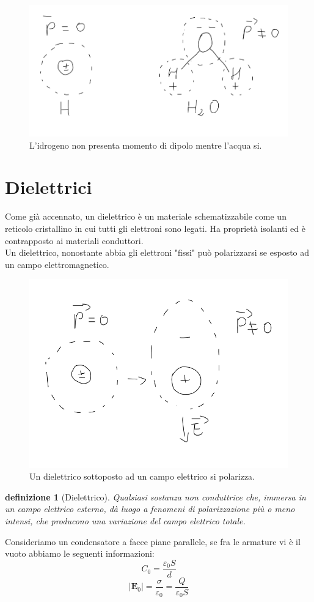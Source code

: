 \documentclass[10pt,a4paper]{article}
\newtheorem{definizione}{definizione}
\begin{document}
\begin{figure}[h!]
	\centering
	\includegraphics[width=0.5\linewidth]{images/dipolo_H_H2O}
	\caption{L'idrogeno non presenta momento di dipolo mentre l'acqua si.}
	\label{fig:dipolohh2o}
\end{figure}
\FloatBarrier
\section{Dielettrici}
Come già accennato, un dielettrico è un materiale schematizzabile come un reticolo cristallino in cui tutti gli elettroni sono legati. Ha proprietà isolanti ed è contrapposto ai materiali conduttori.\\
Un dielettrico, nonostante abbia gli elettroni "fissi" può polarizzarsi se esposto ad un campo elettromagnetico.
\begin{figure}[h!]
	\centering
	\includegraphics[width=0.6\linewidth]{images/dielettrico_idrogeno}
	\caption{Un dielettrico sottoposto ad un campo elettrico si polarizza.}
	\label{fig:dielettricoidrogeno}
\end{figure}
\FloatBarrier
\begin{definizione}[Dielettrico]
	Qualsiasi sostanza non conduttrice che, immersa in un campo elettrico esterno, dà luogo a fenomeni di polarizzazione più o meno intensi, che producono una variazione del campo elettrico totale.
\end{definizione}
Consideriamo un condensatore a facce piane parallele, se fra le armature vi è il vuoto abbiamo le seguenti informazioni:
\[C_0 = \frac{\varepsilon_0S}{d}\]
\[|\mathbf{E}_0| = \frac{\sigma}{\varepsilon_0} = \frac{Q}{\varepsilon_0 S}\]
\end{document}
